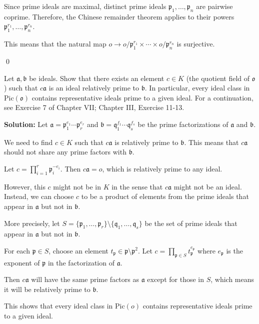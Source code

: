 Since prime ideals are maximal, distinct prime ideals $\mathfrak{p}_1, \ldots, \mathfrak{p}_n$ are pairwise coprime. Therefore, the Chinese remainder theorem applies to their powers $\mathfrak{p}_1^{r_1}, \ldots, \mathfrak{p}_n^{r_n}$.

This means that the natural map $o \rightarrow o/\mathfrak{p}_1^{r_1} \times \cdots \times o/\mathfrak{p}_n^{r_n}$ is surjective.


\qed
\begin{problembox}
Let $\mathfrak{a}, \mathfrak{b}$ be ideals. Show that there exists an element $c \in K$ (the quotient field of $\mathfrak{o}$) such that $c\mathfrak{a}$ is an ideal relatively prime to $\mathfrak{b}$. In particular, every ideal class in $\text{Pic}(\mathfrak{o})$ contains representative ideals prime to a given ideal. For a continuation, see Exercise 7 of Chapter VII; Chapter III, Exercise 11-13.
\end{problembox}

\noindent\textbf{Solution:}
Let $\mathfrak{a} = \mathfrak{p}_1^{e_1} \cdots \mathfrak{p}_r^{e_r}$ and $\mathfrak{b} = \mathfrak{q}_1^{f_1} \cdots \mathfrak{q}_s^{f_s}$ be the prime factorizations of $\mathfrak{a}$ and $\mathfrak{b}$.

We need to find $c \in K$ such that $c\mathfrak{a}$ is relatively prime to $\mathfrak{b}$. This means that $c\mathfrak{a}$ should not share any prime factors with $\mathfrak{b}$.

Let $c = \prod_{i=1}^r \mathfrak{p}_i^{-e_i}$. Then $c\mathfrak{a} = o$, which is relatively prime to any ideal.

However, this $c$ might not be in $K$ in the sense that $c\mathfrak{a}$ might not be an ideal. Instead, we can choose $c$ to be a product of elements from the prime ideals that appear in $\mathfrak{a}$ but not in $\mathfrak{b}$.

More precisely, let $S = \{\mathfrak{p}_1, \ldots, \mathfrak{p}_r\} \setminus \{\mathfrak{q}_1, \ldots, \mathfrak{q}_s\}$ be the set of prime ideals that appear in $\mathfrak{a}$ but not in $\mathfrak{b}$.

For each $\mathfrak{p} \in S$, choose an element $t_{\mathfrak{p}} \in \mathfrak{p} \setminus \mathfrak{p}^2$. Let $c = \prod_{\mathfrak{p} \in S} t_{\mathfrak{p}}^{e_{\mathfrak{p}}}$ where $e_{\mathfrak{p}}$ is the exponent of $\mathfrak{p}$ in the factorization of $\mathfrak{a}$.

Then $c\mathfrak{a}$ will have the same prime factors as $\mathfrak{a}$ except for those in $S$, which means it will be relatively prime to $\mathfrak{b}$.

This shows that every ideal class in $\text{Pic}(o)$ contains representative ideals prime to a given ideal.
